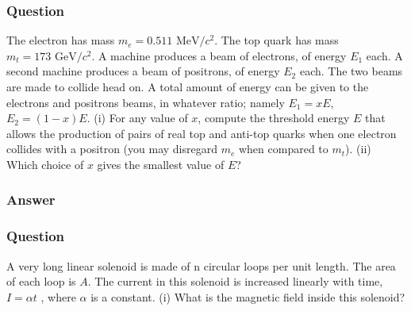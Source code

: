 \subsubsection{Question}

The electron has mass $m_e = 0.511 \text{ MeV}/c^2$. The top quark has mass $m_t = 173 \text{ GeV}/c^2$. A machine produces a beam of electrons, of energy $E_1$ each. A second machine produces a beam of positrons, of energy $E_2$ each. The two beams are made to collide head on. A total amount of energy can be given to the electrons and positrons beams, in whatever ratio; namely $E_1=xE$, $E_2 = (1 - x) E$. (i) For any value of $x$, compute the threshold energy $E$ that allows the production of pairs of real top and anti-top quarks when one electron collides with a positron (you may disregard $m_e$ when compared to $m_t$). (ii) Which choice of $x$ gives the smallest value of $E$?

\subsubsection{Answer}



\subsubsection{Question}
A very long linear solenoid is made of n circular loops per unit length. The area of each loop is $A$. The current in this solenoid is increased linearly with time, $I = \alpha t$ , where $\alpha$ is a constant. (i) What is the magnetic field inside this solenoid?

